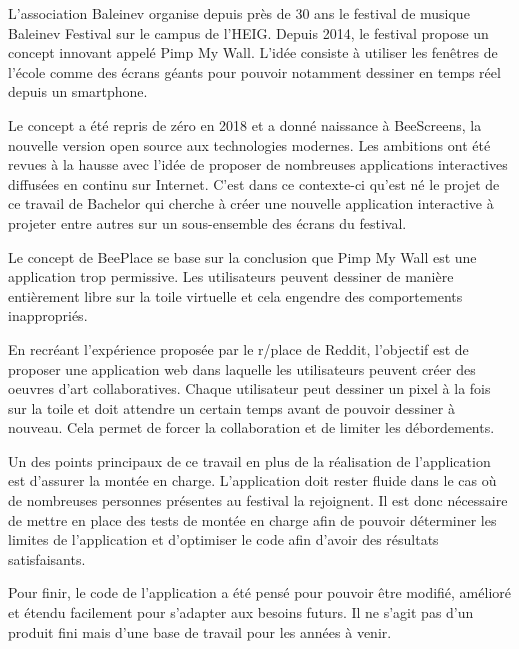 L'association Baleinev organise depuis près de 30 ans le festival de musique Baleinev Festival sur le campus de l'HEIG.
Depuis 2014, le festival propose un concept innovant appelé Pimp My Wall. L'idée consiste à utiliser les fenêtres de l'école comme des écrans géants pour pouvoir notamment dessiner en temps réel depuis un smartphone.

Le concept a été repris de zéro en 2018 et a donné naissance à BeeScreens, la nouvelle version open source aux technologies modernes. Les ambitions ont été revues à la hausse avec l'idée de proposer de nombreuses applications interactives diffusées en continu sur Internet.
C'est dans ce contexte-ci qu'est né le projet de ce travail de Bachelor qui cherche à créer une
nouvelle application interactive à projeter entre autres sur un sous-ensemble des écrans du festival.

\asterism

Le concept de BeePlace se base sur la conclusion que Pimp My Wall est une application trop permissive. Les utilisateurs peuvent dessiner de manière entièrement libre sur la toile virtuelle et cela engendre des comportements inappropriés.

En recréant l'expérience proposée par le r/place de Reddit, l'objectif est de proposer une application web dans laquelle les utilisateurs peuvent créer des oeuvres d'art collaboratives. Chaque utilisateur peut dessiner un pixel à la fois sur la toile et doit attendre un certain temps avant de pouvoir dessiner à nouveau. Cela permet de forcer la collaboration et de limiter les débordements.

Un des points principaux de ce travail en plus de la réalisation de l'application est d'assurer la montée en charge. L'application doit rester fluide dans le cas où de nombreuses personnes présentes au festival la rejoignent. Il est donc nécessaire de mettre en place des tests de montée en charge afin de pouvoir déterminer les limites de l'application et d'optimiser le code afin d'avoir des résultats satisfaisants.

Pour finir, le code de l'application a été pensé pour pouvoir être modifié, amélioré et étendu facilement pour s'adapter aux besoins futurs. Il ne s'agit pas d'un produit fini mais d'une base de travail pour les années à venir.
